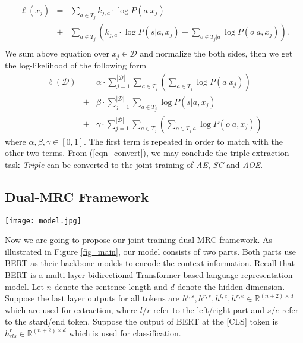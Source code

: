 \documentclass[letterpaper]{article} \usepackage{aaai21}  \usepackage{times}  \usepackage{helvet} \usepackage{courier}  \usepackage[hyphens]{url}  \usepackage{graphicx} \urlstyle{rm} \def\UrlFont{\rm}  \usepackage{natbib}  \usepackage{caption}
\begin{document}
\begin{eqnarray}
    \ell(x_j) &=&  \sum_{a \in T_j}  k_{j,a} \cdot \log P(a|x_j)\nonumber \\
&+&\sum_{a \in T_j} \left(  k_{j,a} \cdot \log P(s|a, x_j) 
     + \sum_{o \in T_j|a} \log P(o|a, x_j)\right). \nonumber\\ 
\end{eqnarray}
We sum above equation over $ x_j \in \mathcal{D}$ and normalize the both sides, then we get
the log-likelihood of the following form
\begin{eqnarray}
    \ell(\mathcal{D}) &=& \alpha \cdot \sum_{j=1}^{|\mathcal{D}|} \sum_{a \in T_j} \left(\sum_{a \in T_j} \log P(a|x_j) \right) \nonumber \\ 
    &+&  \beta \cdot \sum_{j=1}^{|\mathcal{D}|} \sum_{a \in T_j}  \log P(s|a, x_j)  \nonumber \\ 
    &+&  \gamma \cdot \sum_{j=1}^{|\mathcal{D}|} \sum_{a \in T_j}  \left( \sum_{o \in T_j|a} \log P(o|a, x_j) \right) \label{eqn_convert}
\end{eqnarray}
where $\alpha,\beta, \gamma \in [0, 1]$. The first term is repeated in order to match with the other two terms.
From (\ref{eqn_convert}), we may conclude the triple extraction task \emph{Triple} can be converted to the joint training of \emph{AE}, \emph{SC} and \emph{AOE}.

\subsection{Dual-MRC Framework}
\begin{figure*}
    \centering
    \texttt{[image: model.jpg]}
    \caption{Proposed joint training dual-MRC framework.} \label{fig_main}
\end{figure*}
Now we are going to propose our joint training dual-MRC framework. 
As illustrated in Figure \ref{fig_main}, our model consists of two parts. 
Both parts use BERT \cite{devlin2019bert} as their backbone models to encode the context information. 
Recall that BERT is a multi-layer bidirectional Transformer based language representation model. Let $n$ denote the sentence length and $d$ denote the hidden dimension.
Suppose the last layer outputs for all tokens are $h^{l,s}, h^{r,s}, h^{l,e}, h^{r,e}\in \mathbb{R}^{(n+2) \times d}$ which are used for extraction, 
where $l/r$ refer to the left/right part and $s/e$ refer to the stard/end token. 
Suppose the output of BERT at the [CLS] token is $h^{r}_{cls} \in \mathbb{R}^{(n+2) \times d}$ which is used for classification.  
\end{document}
